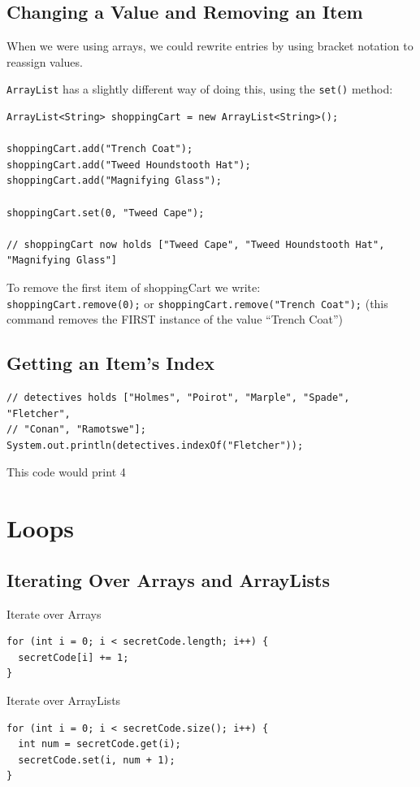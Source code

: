\documentclass[a4paper, 12pt]{article}
\begin{document}
\subsection{Changing a Value and Removing an Item}
When we were using arrays, we could rewrite entries by using bracket notation to reassign values.

\verb|ArrayList| has a slightly different way of doing this, using the \verb|set()| method:
\begin{verbatim}
ArrayList<String> shoppingCart = new ArrayList<String>();

shoppingCart.add("Trench Coat");
shoppingCart.add("Tweed Houndstooth Hat");
shoppingCart.add("Magnifying Glass");

shoppingCart.set(0, "Tweed Cape");

// shoppingCart now holds ["Tweed Cape", "Tweed Houndstooth Hat", "Magnifying Glass"]
\end{verbatim}

To remove the first item of shoppingCart we write:\\
\verb|shoppingCart.remove(0);| or \verb|shoppingCart.remove("Trench Coat");| (this command removes the FIRST instance of the value ``Trench Coat'')

\subsection{Getting an Item's Index}
\begin{verbatim}
// detectives holds ["Holmes", "Poirot", "Marple", "Spade", "Fletcher", 
// "Conan", "Ramotswe"];
System.out.println(detectives.indexOf("Fletcher"));
\end{verbatim}
This code would print 4


\section{Loops}
\subsection{Iterating Over Arrays and ArrayLists}
Iterate over Arrays
\begin{verbatim}
for (int i = 0; i < secretCode.length; i++) {
  secretCode[i] += 1;
}
\end{verbatim}

Iterate over ArrayLists
\begin{verbatim}
for (int i = 0; i < secretCode.size(); i++) {
  int num = secretCode.get(i);
  secretCode.set(i, num + 1);
}
\end{verbatim}
\end{document}
